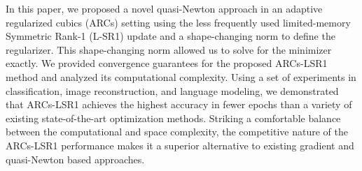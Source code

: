 In this paper, we proposed a novel quasi-Newton approach in an adaptive regularized cubics (ARCs) setting 
using the less frequently used limited-memory Symmetric Rank-1 (L-SR1) update and a shape-changing norm to define the regularizer. This shape-changing norm allowed us to solve for the minimizer exactly.
We provided convergence guarantees for the proposed ARCs-LSR1 method and 
analyzed its computational complexity.  Using a set of experiments in classification, image reconstruction, and language modeling, we demonstrated that ARCs-LSR1 achieves the highest accuracy in fewer epochs than a variety of existing state-of-the-art optimization methods. Striking a comfortable balance between the computational and space complexity, the competitive nature of the ARCs-LSR1 performance makes it a superior alternative to existing gradient and quasi-Newton based approaches.





